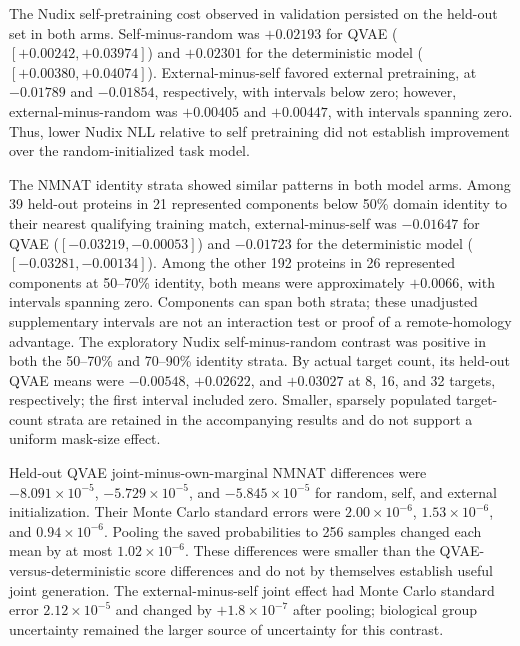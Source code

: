 \documentclass[referee,pdflatex,sn-vancouver-num]{sn-jnl}
\begin{document}
The Nudix self-pretraining cost observed in validation persisted on the held-out set in both arms. Self-minus-random was $+0.02193$ for QVAE ($[+0.00242,+0.03974]$) and $+0.02301$ for the deterministic model ($[+0.00380,+0.04074]$). External-minus-self favored external pretraining, at $-0.01789$ and $-0.01854$, respectively, with intervals below zero; however, external-minus-random was $+0.00405$ and $+0.00447$, with intervals spanning zero. Thus, lower Nudix NLL relative to self pretraining did not establish improvement over the random-initialized task model.

The NMNAT identity strata showed similar patterns in both model arms. Among 39 held-out proteins in 21 represented components below 50\% domain identity to their nearest qualifying training match, external-minus-self was $-0.01647$ for QVAE ($[-0.03219,-0.00053]$) and $-0.01723$ for the deterministic model ($[-0.03281,-0.00134]$). Among the other 192 proteins in 26 represented components at 50--70\% identity, both means were approximately $+0.0066$, with intervals spanning zero. Components can span both strata; these unadjusted supplementary intervals are not an interaction test or proof of a remote-homology advantage. The exploratory Nudix self-minus-random contrast was positive in both the 50--70\% and 70--90\% identity strata. By actual target count, its held-out QVAE means were $-0.00548$, $+0.02622$, and $+0.03027$ at 8, 16, and 32 targets, respectively; the first interval included zero. Smaller, sparsely populated target-count strata are retained in the accompanying results and do not support a uniform mask-size effect.

Held-out QVAE joint-minus-own-marginal NMNAT differences were $-8.091\times10^{-5}$, $-5.729\times10^{-5}$, and $-5.845\times10^{-5}$ for random, self, and external initialization. Their Monte Carlo standard errors were $2.00\times10^{-6}$, $1.53\times10^{-6}$, and $0.94\times10^{-6}$. Pooling the saved probabilities to 256 samples changed each mean by at most $1.02\times10^{-6}$. These differences were smaller than the QVAE-versus-deterministic score differences and do not by themselves establish useful joint generation. The external-minus-self joint effect had Monte Carlo standard error $2.12\times10^{-5}$ and changed by $+1.8\times10^{-7}$ after pooling; biological group uncertainty remained the larger source of uncertainty for this contrast.
\end{document}
